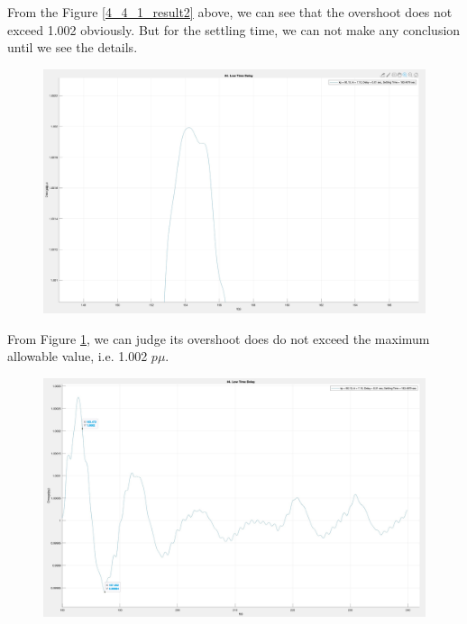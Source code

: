 \documentclass{report}
\begin{document}
From the Figure \textcolor{red}{\ref{4_4_1_result2}} above, we can see that the overshoot does not exceed 1.002 obviously. But for the settling time, we can not make any conclusion until we see the details. \\


\begin{figure}[htbp]
\centering
\includegraphics[width = \textwidth]{figure/4_4_1_result3.jpeg}
\caption{}
\label{4_4_1_result3}
\end{figure}

From Figure \textcolor{red}{\ref{4_4_1_result3}}, we can judge its overshoot does do not exceed the maximum allowable value, i.e. 1.002 $p\mu$.

\begin{figure}[htbp]
\centering
\includegraphics[width = \textwidth]{figure/4_4_1_result4.jpeg}
\caption{}
\label{4_4_1_result4}
\end{figure}
\end{document}
